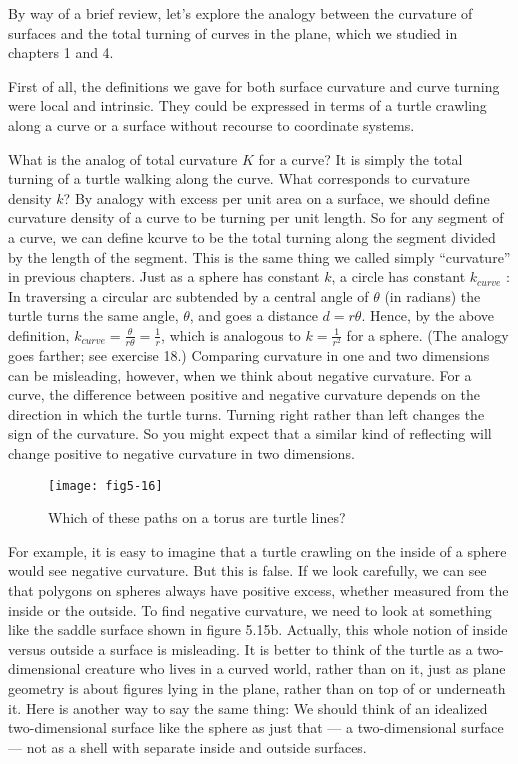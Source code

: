\documentclass{book}
\begin{document}
By way of a brief review, let's explore the analogy between the curvature
of surfaces and the total turning of curves in the plane, which we studied
in chapters 1 and 4.

First of all, the definitions we gave for both surface curvature and
curve turning were local and intrinsic. They could be expressed in
terms of a turtle crawling along a curve or a surface without recourse to
coordinate systems.

What is the analog of total curvature $K$ for a curve? It is simply the
total turning of a turtle walking along the curve. What corresponds to
curvature density $k$? By analogy with excess per unit area on a surface,
we should define curvature density of a curve to be turning per unit
length. So for any segment of a curve, we can define kcurve to be the
total turning along the segment divided by the length of the segment.
This is the same thing we called simply ``curvature'' in previous chapters.
Just as a sphere has constant $k$, a circle has constant $k_{curve}$ : In
traversing a circular arc subtended by a central angle of $\theta$ (in radians)
the turtle turns the same angle, $\theta$, and goes a distance $d = r\theta$. Hence,
by the above definition, $k_{curve} = \frac{\theta}  {r \theta} = \frac {1} {r}$, which is analogous to
$k = \frac {1} {r^2}$ for a sphere. (The analogy goes farther; see exercise 18.)
Comparing curvature in one and two dimensions can be misleading,
however, when we think about negative curvature. For a curve, the
difference between positive and negative curvature depends on the direction in which the turtle turns. Turning right rather than left changes
the sign of the curvature. So you might expect that a similar kind of
reflecting will change positive to negative curvature in two dimensions.

\begin{figure}
\begin{center}
\texttt{[image: fig5-16]}
\caption{Which of these paths on a torus are turtle lines?}
\end{center}
\end{figure}


For example, it is easy to imagine that a turtle crawling on the inside
of a sphere would see negative curvature. But this is false. If we look
carefully, we can see that polygons on spheres always have positive excess, whether measured from the inside or the outside. To find negative
curvature, we need to look at something like the saddle surface shown in
figure 5.15b. Actually, this whole notion of inside versus outside a surface is misleading. It is better to think of the turtle as a two-dimensional
creature who lives in a curved world, rather than on it, just as plane
geometry is about figures lying in the plane, rather than on top of or underneath it. Here is another way to say the same thing: We should think
of an idealized two-dimensional surface like the sphere as just that --- a
two-dimensional surface --- not as a shell with separate inside and outside
surfaces.
\end{document}
